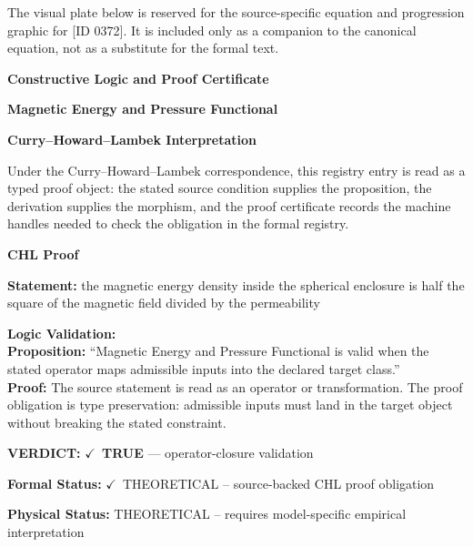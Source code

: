 \begingroup\footnotesize\sloppy
The visual plate below is reserved for the source-specific equation and progression graphic for [ID 0372]. It is included only as a companion to the canonical equation, not as a substitute for the formal text.
\par\endgroup
\ifTZPDarkEdition
{}
\fi

\clearpage
\begingroup\tzpsupportsetup
\noindent\textbf{\fontsize{10.8pt}{12.8pt}\selectfont [ID 0372] Constructive Logic and Proof Certificate}\par
\noindent\textbf{\fontsize{10pt}{12pt}\selectfont Magnetic Energy and Pressure Functional}\par
\vspace{0.45em}
\begingroup
\footnotesize
\setlength{\parskip}{0.22em}
\setlength{\parindent}{0pt}
\noindent\textbf{Curry--Howard--Lambek Interpretation}\par
Under the Curry--Howard--Lambek correspondence, this registry entry is read as a typed proof
object: the stated source condition supplies the proposition, the derivation supplies the
morphism, and the proof certificate records the machine handles needed to check the obligation
in the formal registry.

\vspace{0.45em}
\noindent\textbf{CHL Proof}\par
\textbf{Statement:} the magnetic energy density inside the spherical enclosure is half the square of the
magnetic field divided by the permeability

\textbf{Logic Validation:}\\
\textbf{Proposition:} ``Magnetic Energy and Pressure Functional is valid when the stated operator maps
admissible inputs into the declared target class.''\\
\textbf{Proof:} The source statement is read as an operator or transformation. The proof obligation is
type preservation: admissible inputs must land in the target object without breaking the
stated constraint.

\textbf{VERDICT:} \ensuremath{\checkmark}\ \textbf{TRUE} --- operator-closure validation

\textbf{Formal Status:} \ensuremath{\checkmark}\ THEORETICAL -- source-backed CHL proof obligation

\textbf{Physical Status:} THEORETICAL -- requires model-specific empirical interpretation
\par\vspace{0.45em}
\par
\ifTZPDarkEdition
{}
\fi
\endgroup
\endgroup
